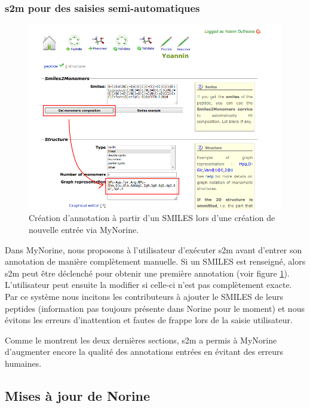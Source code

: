 \subsubsection{s2m pour des saisies semi-automatiques}

\begin{figure}[h!]
  \begin{center}
    \includegraphics[width=450px]{Figures/contributions/s2m_automatic.png}
    \caption{\label{s2m_automatic}Création d'annotation à partir d'un SMILES lors d'une création de nouvelle entrée via MyNorine.}
  \end{center}
\end{figure}

Dans MyNorine, nous proposons à l'utilisateur d'exécuter s2m avant d'entrer son annotation de manière complètement manuelle.
Si un SMILES est renseigné, alors s2m peut être déclenché pour obtenir une première annotation (voir figure \ref{s2m_automatic}).
L'utilisateur peut ensuite la modifier si celle-ci n'est pas complètement exacte.
Par ce système nous incitons les contributeurs à ajouter le SMILES de leurs peptides (information pas toujours présente dans Norine pour le moment) et nous évitons les erreurs d'inattention et fautes de frappe lors de la saisie utilisateur.

Comme le montrent les deux dernières sections, s2m a permis à MyNorine d'augmenter encore la qualité des annotations entrées en évitant des erreurs humaines.




\subsection{Mises à jour de Norine}


